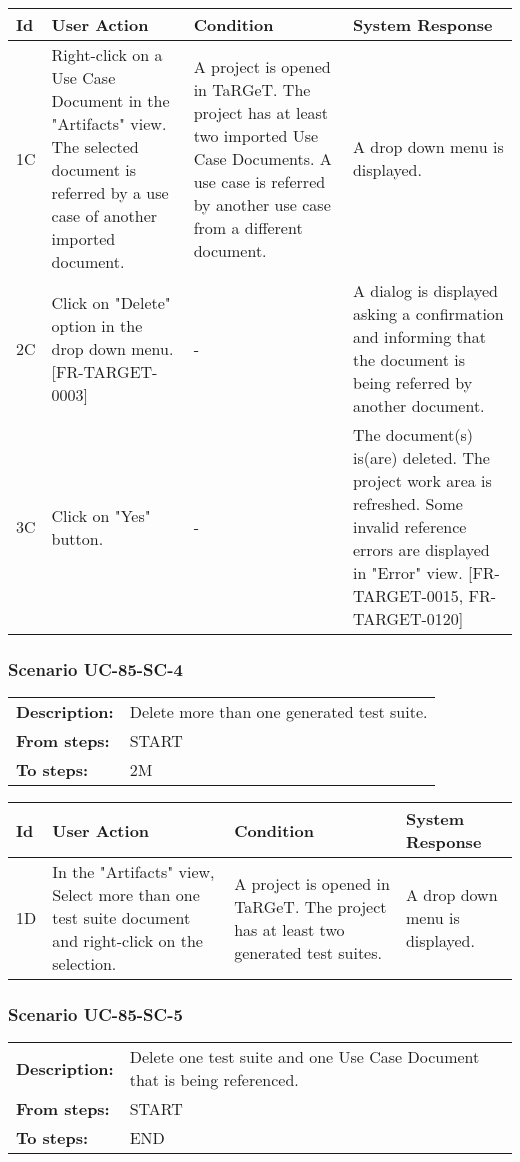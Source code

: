 \documentclass[a4paper,11pt]{article}
\newcommand{\bl}{\\ \hline}
\begin{document}
\begin{tabular}{|p{0.8in}|p{1.6in}|p{1.6in}|p{1.6in}|}
\hline
Id & User Action & Condition & System Response  \bl 
1C & Right-click on a Use Case Document in the "Artifacts" view. The selected document is referred by a use case of another imported document. & A project is opened in TaRGeT. The project has at least two imported Use Case Documents. A use case is referred by another use case from a different document. & A drop down menu is displayed. \bl 
2C & Click on "Delete" option in the drop down menu. [FR-TARGET-0003] & - & A dialog is displayed asking a confirmation and informing that the document is being referred by another document. \bl 
3C & Click on "Yes" button. & - & The document(s) is(are) deleted. The project work area is refreshed. Some invalid reference errors are displayed in "Error" view. [FR-TARGET-0015, FR-TARGET-0120] \bl 
\end{tabular}
\subsubsection*{Scenario UC-85-SC-4}
\begin{tabular}{p{1in}p{4in}}
{\bf Description:} & Delete more than one generated test suite. \\
{\bf From steps:} & START \\
{\bf To steps:} & 2M \\
\end{tabular}
 
\begin{tabular}{|p{0.8in}|p{1.6in}|p{1.6in}|p{1.6in}|}
\hline
Id & User Action & Condition & System Response  \bl 
1D & In the "Artifacts" view, Select more than one test suite document and right-click on the selection. & A project is opened in TaRGeT. The project has at least two generated test suites. & A drop down menu is displayed. \bl 
\end{tabular}
\subsubsection*{Scenario UC-85-SC-5}
\begin{tabular}{p{1in}p{4in}}
{\bf Description:} & Delete one test suite and one Use Case Document that is being referenced. \\
{\bf From steps:} & START \\
{\bf To steps:} & END \\
\end{tabular}
 
\end{document}
